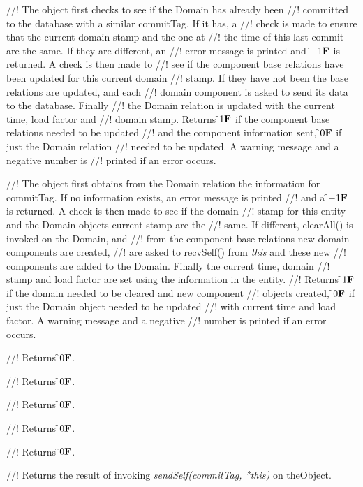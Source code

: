 //! The object first checks to see if the Domain has already been
//! committed to the database with a similar \p commitTag. If it has, a
//! check is made to ensure that the current domain stamp and the one at
//! the time of this last commit are the same. If they are different, an
//! error message is printed and \f$-1{\bf F}$ is returned. A check is then made to
//! see if the component base relations have been updated for this current domain
//! stamp. If they have not been the base relations are updated, and each
//! domain component is asked to send its data to the database. Finally
//! the Domain relation is updated with the current time, load factor and
//! domain stamp. Returns \f$1{\bf F}$ if the component base relations needed to be updated
//! and the component information sent, \f$0{\bf F}$ if just the Domain relation
//! needed to be updated. A warning message and a negative number is
//! printed if an error occurs.


//! The object first obtains from the Domain relation the information for
\p commitTag. If no information exists, an error message is printed
//! and a \f$-1{\bf F}$ is returned. A check is then made to see if the domain
//! stamp for this entity and the Domain objects current stamp are the
//! same. If different, clearAll() is invoked on the Domain, and
//! from the component base relations new domain components are created,
//! are asked to recvSelf() from {\em *this} and these new
//! components are added to the Domain. Finally the current time, domain
//! stamp and load factor are set using the information in the entity. 
//! Returns \f$1{\bf F}$ if the domain needed to be cleared and new component
//! objects created, \f$0{\bf F}$ if just the Domain object needed to be updated
//! with current time and load factor. A warning message and a negative
//! number is printed if an error occurs.

//! Returns \f$0{\bf F}$.

//! Returns \f$0{\bf F}$.

//! Returns \f$0{\bf F}$.

//! Returns \f$0{\bf F}$.

//! Returns \f$0{\bf F}$.

//! Returns the result of invoking {\em sendSelf(commitTag, *this)} on
\p theObject.

